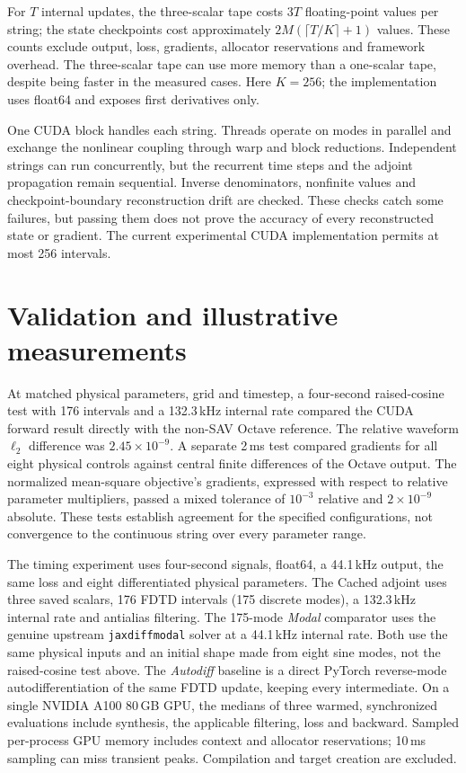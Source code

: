 \documentclass[a4paper,10pt]{article}
\begin{document}
For $T$ internal updates, the three-scalar tape costs $3T$ floating-point values per string; the state checkpoints cost approximately $2M(\lceil T/K\rceil+1)$ values. These counts exclude output, loss, gradients, allocator reservations and framework overhead. The three-scalar tape can use more memory than a one-scalar tape, despite being faster in the measured cases. Here $K=256$; the implementation uses float64 and exposes first derivatives only.

One CUDA block handles each string. Threads operate on modes in parallel and exchange the nonlinear coupling through warp and block reductions. Independent strings can run concurrently, but the recurrent time steps and the adjoint propagation remain sequential. Inverse denominators, nonfinite values and checkpoint-boundary reconstruction drift are checked. These checks catch some failures, but passing them does not prove the accuracy of every reconstructed state or gradient. The current experimental CUDA implementation permits at most 256 intervals.

\section{Validation and illustrative measurements}
At matched physical parameters, grid and timestep, a four-second raised-cosine test with 176 intervals and a 132.3\,kHz internal rate compared the CUDA forward result directly with the non-SAV Octave reference. The relative waveform $\ell_2$ difference was $2.45\times10^{-9}$. A separate 2\,ms test compared gradients for all eight physical controls against central finite differences of the Octave output. The normalized mean-square objective's gradients, expressed with respect to relative parameter multipliers, passed a mixed tolerance of $10^{-3}$ relative and $2\times10^{-9}$ absolute. These tests establish agreement for the specified configurations, not convergence to the continuous string over every parameter range.

The timing experiment uses four-second signals, float64, a 44.1\,kHz output, the same loss and eight differentiated physical parameters. The Cached adjoint uses three saved scalars, 176 FDTD intervals (175 discrete modes), a 132.3\,kHz internal rate and antialias filtering. The 175-mode \emph{Modal} comparator uses the genuine upstream \texttt{jaxdiffmodal} solver at a 44.1\,kHz internal rate. Both use the same physical inputs and an initial shape made from eight sine modes, not the raised-cosine test above. The \emph{Autodiff} baseline is a direct PyTorch reverse-mode autodifferentiation of the same FDTD update, keeping every intermediate. On a single NVIDIA A100 80\,GB GPU, the medians of three warmed, synchronized evaluations include synthesis, the applicable filtering, loss and backward. Sampled per-process GPU memory includes context and allocator reservations; 10\,ms sampling can miss transient peaks. Compilation and target creation are excluded.
\end{document}
